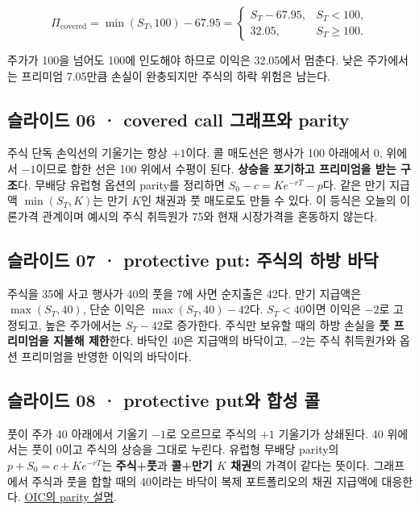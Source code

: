 \documentclass[11pt,a4paper]{article}
\begin{document}
\[
\Pi_{\mathrm{covered}}=\min(S_T,100)-67.95
=\begin{cases}S_T-67.95,&S_T<100,\\32.05,&S_T\geq100.\end{cases}
\]

주가가 100을 넘어도 100에 인도해야 하므로 이익은 32.05에서 멈춘다. 낮은 주가에서는 프리미엄 7.05만큼 손실이 완충되지만 주식의 하락 위험은 남는다.\par

\subsection{슬라이드 06 · covered call 그래프와 parity}
주식 단독 손익선의 기울기는 항상 $+1$이다. 콜 매도선은 행사가 100 아래에서 0, 위에서 $-1$이므로 합한 선은 100 위에서 수평이 된다. \textbf{상승을 포기하고 프리미엄을 받는 구조}다. 무배당 유럽형 옵션의 parity를 정리하면 $S_0-c=Ke^{-rT}-p$다. 같은 만기 지급액 $\min(S_T,K)$는 만기 $K$인 채권과 풋 매도로도 만들 수 있다. 이 등식은 오늘의 이론가격 관계이며 예시의 주식 취득원가 75와 현재 시장가격을 혼동하지 않는다.\par

\subsection{슬라이드 07 · protective put: 주식의 하방 바닥}
주식을 35에 사고 행사가 40의 풋을 7에 사면 순지출은 42다. 만기 지급액은 $\max(S_T,40)$, 단순 이익은 $\max(S_T,40)-42$다. $S_T<40$이면 이익은 $-2$로 고정되고, 높은 주가에서는 $S_T-42$로 증가한다. 주식만 보유할 때의 하방 손실을 \textbf{풋 프리미엄을 지불해 제한}한다. 바닥인 40은 지급액의 바닥이고, $-2$는 주식 취득원가와 옵션 프리미엄을 반영한 이익의 바닥이다.\par

\subsection{슬라이드 08 · protective put와 합성 콜}
풋이 주가 40 아래에서 기울기 $-1$로 오르므로 주식의 $+1$ 기울기가 상쇄된다. 40 위에서는 풋이 0이고 주식의 상승을 그대로 누린다. 유럽형 무배당 parity의 $p+S_0=c+Ke^{-rT}$는 \textbf{주식+풋}과 \textbf{콜+만기 $K$ 채권}의 가격이 같다는 뜻이다. 그래프에서 주식과 풋을 합할 때의 40이라는 바닥이 복제 포트폴리오의 채권 지급액에 대응한다. \href{https://www.optionseducation.org/advancedconcepts/put-call-parity}{OIC의 parity 설명}.\par
\end{document}
